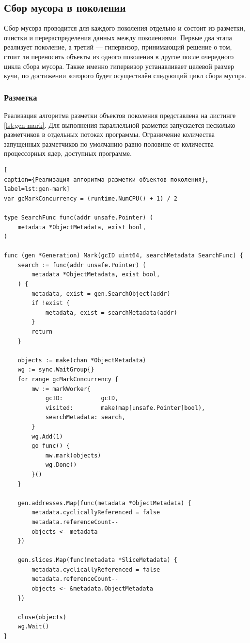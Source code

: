 \subsection{Сбор мусора в поколении}

Сбор мусора проводится для каждого поколения отдельно и состоит из разметки, очистки и перераспределения данных между поколениями. Первые два этапа реализует поколение, а третий --- гипервизор, принимающий решение о том, стоит ли переносить объекты из одного поколения в другое после очередного цикла сбора мусора. Также именно гипервизор устанавливает целевой размер кучи, по достижении которого будет осуществлён следующий цикл сбора мусора.

\subsubsection{Разметка}

Реализация алгоритма разметки объектов поколения представлена на листинге \ref{lst:gen-mark}. Для выполнения параллельной разметки запускается несколько разметчиков в отдельных потоках программы. Ограничение количества запущенных разметчиков по умолчанию равно половине от количества процессорных ядер, доступных программе.

\begin{lstlisting}[
caption={Реализация алгоритма разметки объектов поколения},
label=lst:gen-mark]
var gcMarkConcurrency = (runtime.NumCPU() + 1) / 2

type SearchFunc func(addr unsafe.Pointer) (
	metadata *ObjectMetadata, exist bool,
)

func (gen *Generation) Mark(gcID uint64, searchMetadata SearchFunc) {
	search := func(addr unsafe.Pointer) (
		metadata *ObjectMetadata, exist bool,
	) {
		metadata, exist = gen.SearchObject(addr)
		if !exist {
			metadata, exist = searchMetadata(addr)
		}
		return
	}
	
	objects := make(chan *ObjectMetadata)
	wg := sync.WaitGroup{}
	for range gcMarkConcurrency {
		mw := markWorker{
			gcID:           gcID,
			visited:        make(map[unsafe.Pointer]bool),
			searchMetadata: search,
		}
		wg.Add(1)
		go func() {
			mw.mark(objects)
			wg.Done()
		}()
	}
	
	gen.addresses.Map(func(metadata *ObjectMetadata) {
		metadata.cyclicallyReferenced = false
		metadata.referenceCount--
		objects <- metadata
	})
	
	gen.slices.Map(func(metadata *SliceMetadata) {
		metadata.cyclicallyReferenced = false
		metadata.referenceCount--
		objects <- &metadata.ObjectMetadata
	})
	
	close(objects)
	wg.Wait()
}
\end{lstlisting}

